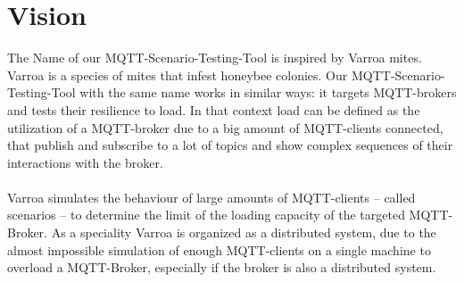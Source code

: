 \chapter{Vision}
The Name of our MQTT-Scenario-Testing-Tool is inspired by Varroa mites.
Varroa is a species of mites that infest honeybee colonies. %
Our MQTT-Scenario-Testing-Tool with the same name works in similar ways: it targets MQTT-brokers and tests their resilience to load.
In that context load can be defined as the utilization of a MQTT-broker due to a big amount of MQTT-clients connected, that publish and subscribe to a lot of topics and show complex sequences of their interactions with the broker.\\
\\
Varroa simulates the behaviour of large amounts of MQTT-clients -- called scenarios -- to determine the limit of the loading capacity of the targeted MQTT-Broker.
As a speciality Varroa is organized as a distributed system, due to the almost impossible simulation of enough MQTT-clients on a single machine to overload a MQTT-Broker, especially if the broker is also a distributed system.